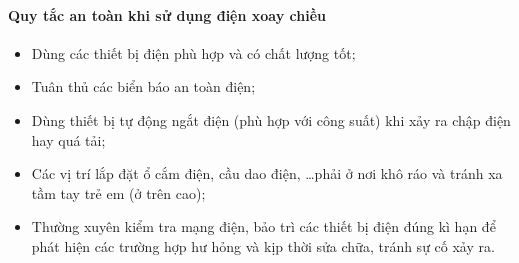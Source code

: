 \begin{tomtat}
\paragraph{Quy tắc an toàn khi sử dụng điện xoay chiều}
\begin{itemize}
	\item Dùng các thiết bị điện phù hợp và có chất lượng tốt;
	\item Tuân thủ các biển báo an toàn điện;
	\item Dùng thiết bị tự động ngắt điện (phù hợp với công suất) khi xảy ra chập điện hay quá tải;
	\item Các vị trí lắp đặt ổ cắm điện, cầu dao điện, \dots phải ở nơi khô ráo và tránh xa tầm tay trẻ em (ở trên cao);
	\item Thường xuyên kiểm tra mạng điện, bảo trì các thiết bị điện đúng kì hạn để phát hiện các trường hợp hư hỏng và kịp thời sửa chữa, tránh sự cố xảy ra.
\end{itemize}
\end{tomtat}
